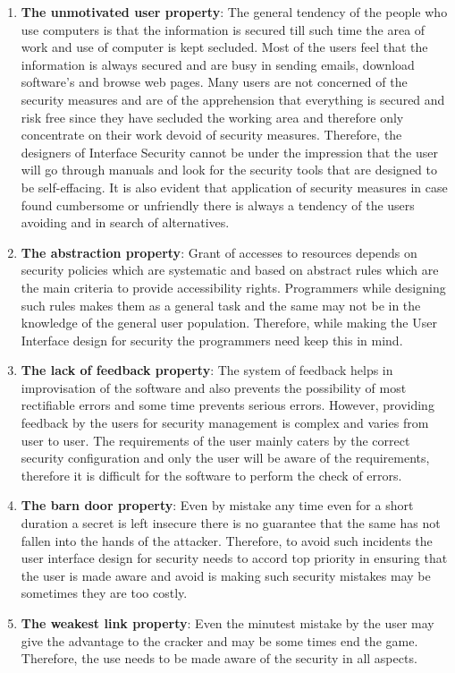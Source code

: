   \begin{enumerate}
  	\item \textbf{The unmotivated user property}: The general tendency of the people who use computers is that the information is secured till such time the area of work and use of computer is kept secluded.  Most of the users feel that the information is always secured and are busy in sending emails, download software’s and browse web pages.  Many users are not concerned of the security measures and are of the apprehension that everything is secured and risk free since they have secluded the working area and therefore only concentrate on their work devoid of security measures.  Therefore, the designers of Interface Security cannot be under the impression that the user will go through manuals and look for the security tools that are designed to be self-effacing.  It is also evident that application of security measures in case found cumbersome or unfriendly there is always a tendency of the users avoiding and in search of alternatives.
  	
	\item \textbf{The abstraction property}: Grant of accesses to resources depends on security policies which are systematic and based on abstract rules which are the main criteria to provide accessibility rights.  Programmers while designing such rules makes them as a general task and the same may not be in the knowledge of the general user population.  Therefore, while making the User Interface design for security the programmers need keep this in mind.
	
    \item \textbf{The lack of feedback property}: The system of feedback helps in improvisation of the software and also prevents the possibility of most rectifiable errors and some time prevents serious errors.  However, providing feedback by the users for security management is complex and varies from user to user.  The requirements of the user mainly caters by the correct security configuration and only the user will be aware of the requirements, therefore it is difficult for the software to perform the check of errors.
    
    \item \textbf{The barn door property}:  Even by mistake any time even for a short duration a secret is left insecure there is no guarantee that the same has not fallen into the hands of the attacker.  Therefore, to avoid such incidents the user interface design for security  needs to accord top priority in ensuring that the user is made aware and avoid is making such security mistakes may be sometimes they are too costly.
    
    \item \textbf{The weakest link property}: Even the minutest mistake by the user may give the advantage to the cracker and may be some times end the game.  Therefore, the use needs to be made aware of the security in all aspects.
     ~\cite{whitten1999johnny}
  	\end{enumerate}
  
